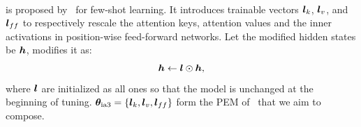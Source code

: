 \paragraph{\ia} is proposed by~\citet{liu2022few} for few-shot learning. 
It introduces trainable vectors ${\bm{l}}_k$, ${\bm{l}}_v$, and ${\bm{l}}_{ff}$ to respectively rescale the attention keys, attention values and the inner activations in position-wise feed-forward networks. 
Let the modified hidden states be ${\bm{h}}$, \ia modifies it as:
\begin{equation}
\label{eq:ia3}
    {\bm{h}} \leftarrow {\bm{l}} \odot {\bm{h}},
\end{equation}
where ${\bm{l}}$ are initialized as all ones so that the model is unchanged at the beginning of tuning. ${\bm{\theta}}_{\text{ia3}}=\{{\bm{l}}_k, {\bm{l}}_v, {\bm{l}}_{ff}\}$ form the PEM of \ia~that we aim to compose.








